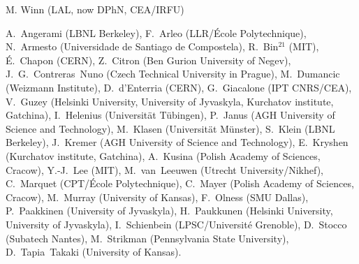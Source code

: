 { \small
{} M. Winn (LAL, now DPhN, CEA/IRFU) %

 A.~Angerami (LBNL Berkeley), %
 F.~Arleo (LLR/{\'E}cole Polytechnique), %
 N{.~Armesto (Universidade de Santiago de Compostela), %
 R.~Bin$^{21}$ (MIT), %
 {\'E}.~Chapon (CERN), %
 Z.~Citron (Ben Gurion University of Negev), %
 J.~G.~Contreras~Nuno (Czech Technical University in Prague),  %
 M.~Dumancic (Weizmann Institute),
 D.~d'Enterria (CERN), %
 G.~Giacalone (IPT CNRS/CEA), %
 V.~Guzey (Helsinki University, University of Jyvaskyla, Kurchatov institute, Gatchina),  %
 I.~Helenius (Universit\"{a}t T\"{u}bingen), %
P.~Janus (AGH University of Science and Technology),
M.~Klasen (Universit\"{a}t M\"{u}nster), %
S.~Klein (LBNL Berkeley), %
J.~Kremer (AGH University of Science and Technology),
 E.~Kryshen (Kurchatov institute, Gatchina), %
 A.~Kusina (Polish Academy of Sciences, Cracow), %
 Y.-J.~Lee (MIT), %
 M.~van~Leeuwen (Utrecht University/Nikhef), %
 C.~Marquet (CPT/{\'E}cole Polytechnique), %
 C.~Mayer  (Polish Academy of Sciences, Cracow), %
 M.~Murray (University of Kansas),%
 F.~Olness (SMU Dallas), %
 P.~Paakkinen (University of Jyvaskyla),%
 H.~Paukkunen (Helsinki University, University of Jyvaskyla), %
 I.~Schienbein (LPSC/Universit{\'e} Grenoble), %
 D.~Stocco (Subatech Nantes), %
 M.~Strikman (Pennsylvania State University), %
 D.~Tapia~Takaki (University of Kansas). %
}

}
